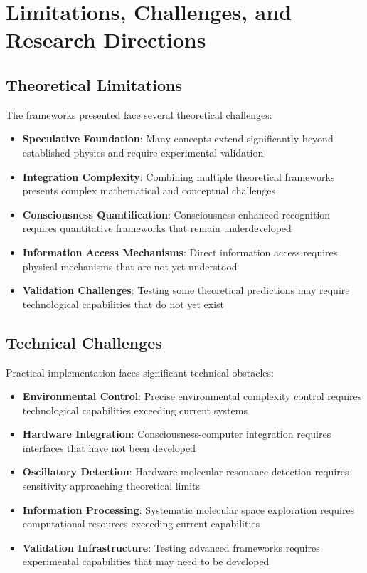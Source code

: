 \documentclass[11pt,a4paper]{article}
\theoremstyle{remark}
\begin{document}
{{{{{{{{{{\section{Limitations, Challenges, and Research Directions}

\subsection{Theoretical Limitations}

The frameworks presented face several theoretical challenges:

\begin{itemize}
\item \textbf{Speculative Foundation}: Many concepts extend significantly beyond established physics and require experimental validation
\item \textbf{Integration Complexity}: Combining multiple theoretical frameworks presents complex mathematical and conceptual challenges
\item \textbf{Consciousness Quantification}: Consciousness-enhanced recognition requires quantitative frameworks that remain underdeveloped
\item \textbf{Information Access Mechanisms}: Direct information access requires physical mechanisms that are not yet understood
\item \textbf{Validation Challenges}: Testing some theoretical predictions may require technological capabilities that do not yet exist
\end{itemize}

\subsection{Technical Challenges}

Practical implementation faces significant technical obstacles:

\begin{itemize}
\item \textbf{Environmental Control}: Precise environmental complexity control requires technological capabilities exceeding current systems
\item \textbf{Hardware Integration}: Consciousness-computer integration requires interfaces that have not been developed
\item \textbf{Oscillatory Detection}: Hardware-molecular resonance detection requires sensitivity approaching theoretical limits
\item \textbf{Information Processing}: Systematic molecular space exploration requires computational resources exceeding current capabilities
\item \textbf{Validation Infrastructure}: Testing advanced frameworks requires experimental capabilities that may need to be developed
\end{itemize}

}}}}}}}}}}
\end{document}
